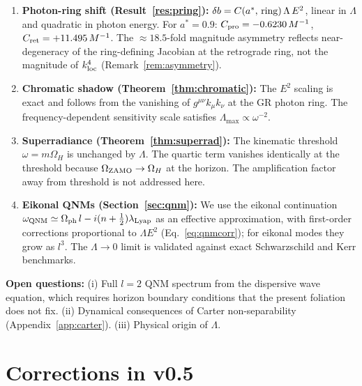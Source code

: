 \documentclass[12pt,a4paper]{article}
\newcommand{\OmH}{\Omega_H}
\newcommand{\Omph}{\Omega_{\rm ph}}
\newcommand{\lLyap}{\lambda_{\rm Lyap}}
\begin{document}
\begin{enumerate}
  \item \textbf{Photon-ring shift (Result~\ref{res:pring}):}
    $\delta b = C(a^*,\,{\rm ring})\,\Lambda\,E^2$, linear in $\Lambda$
    and quadratic in photon energy. For $a^*=0.9$:
    $C_{\rm pro}=-0.6230\,M^{-1}$, $C_{\rm ret}=+11.495\,M^{-1}$.
    The $\approx18.5$-fold magnitude asymmetry reflects near-degeneracy
    of the ring-defining Jacobian at the retrograde ring, not the
    magnitude of $k_{\rm loc}^4$ (Remark~\ref{rem:asymmetry}).

  \item \textbf{Chromatic shadow (Theorem~\ref{thm:chromatic}):}
    The $E^2$ scaling is exact and follows from the vanishing of
    $g^{\mu\nu}k_\mu k_\nu$ at the GR photon ring.
    The frequency-dependent sensitivity scale satisfies
    $\Lambda_{\max}\propto\omega^{-2}$.

  \item \textbf{Superradiance (Theorem~\ref{thm:superrad}):}
    The kinematic threshold $\omega=m\OmH$ is unchanged by $\Lambda$.
    The quartic term vanishes identically at the threshold because
    $\Omega_{\rm ZAMO}\to\OmH$ at the horizon. The amplification
    factor away from threshold is not addressed here.

  \item \textbf{Eikonal QNMs (Section~\ref{sec:qnm}):}
    We use the eikonal continuation
    $\omega_{\rm QNM}\simeq\Omph\,l-i(n+\tfrac{1}{2})\lLyap$
    as an effective approximation, with first-order corrections
    proportional to $\Lambda E^2$ (Eq.~\eqref{eq:qnmcorr}); for eikonal modes
    they grow as $l^3$. The $\Lambda\to0$ limit is validated against
    exact Schwarzschild and Kerr benchmarks.
\end{enumerate}

\textbf{Open questions:}
(i) Full $l=2$ QNM spectrum from the dispersive wave equation, which
requires horizon boundary conditions that the present foliation does not fix.
(ii) Dynamical consequences of Carter non-separability (Appendix~\ref{app:carter}).
(iii) Physical origin of $\Lambda$.

\section*{Corrections in v0.5}
\label{sec:corrections}
\end{document}
